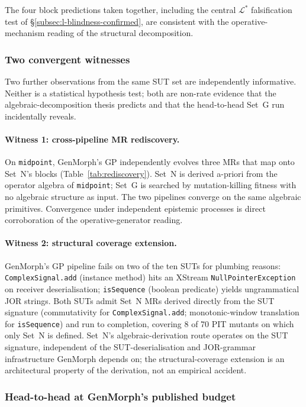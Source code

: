 \documentclass[manuscript]{acmart}
\begin{document}
The four block predictions taken together, including the central
$\mathcal{L}^{*}$ falsification test of
\S\ref{subsec:l-blindness-confirmed}, are consistent with the
operative-mechanism reading of the structural decomposition.

\subsubsection{Two convergent witnesses}
\label{subsec:convergent-witnesses}

Two further observations from the same SUT set are independently
informative. Neither is a statistical hypothesis test; both are
non-rate evidence that the algebraic-decomposition thesis predicts
and that the head-to-head Set~G run incidentally reveals.

\paragraph{Witness 1: cross-pipeline MR rediscovery.}
On \texttt{midpoint}, GenMorph's GP independently evolves three MRs
that map onto Set~N's blocks (Table~\ref{tab:rediscovery}). Set~N is
derived a-priori from the operator algebra of \texttt{midpoint};
Set~G is searched by mutation-killing fitness with no algebraic
structure as input. The two pipelines converge on the same algebraic
primitives. Convergence under independent epistemic processes is
direct corroboration of the operative-generator reading.

\paragraph{Witness 2: structural coverage extension.}
GenMorph's GP pipeline fails on two of the ten SUTs for plumbing reasons: \texttt{ComplexSignal.add} (instance method) hits an XStream \texttt{NullPointerException} on receiver deserialisation; \texttt{isSequence} (boolean predicate) yields ungrammatical JOR strings. Both SUTs admit Set~N MRs derived directly from the SUT signature (commutativity for \texttt{ComplexSignal.add}; monotonic-window translation for \texttt{isSequence}) and run to completion, covering 8 of 70 PIT mutants on which only Set~N is defined. Set~N's algebraic-derivation route operates on the SUT signature, independent of the SUT-deserialisation and JOR-grammar infrastructure GenMorph depends on; the structural-coverage extension is an architectural property of the derivation, not an empirical accident.

\subsubsection{Head-to-head at GenMorph's published budget}
\label{subsec:pooled-headtohead}
\end{document}
